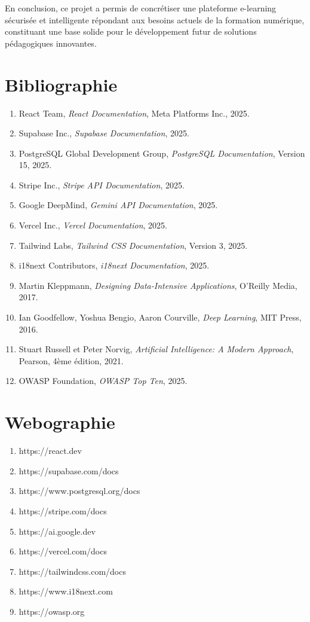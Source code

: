 \documentclass[12pt, a4paper]{report}
\begin{document}
En conclusion, ce projet a permis de concrétiser une plateforme e-learning sécurisée et intelligente répondant aux besoins actuels de la formation numérique, constituant une base solide pour le développement futur de solutions pédagogiques innovantes.

\chapter*{Bibliographie}

\begin{enumerate}
\item React Team, \textit{React Documentation}, Meta Platforms Inc., 2025.
\item Supabase Inc., \textit{Supabase Documentation}, 2025.
\item PostgreSQL Global Development Group, \textit{PostgreSQL Documentation}, Version 15, 2025.
\item Stripe Inc., \textit{Stripe API Documentation}, 2025.
\item Google DeepMind, \textit{Gemini API Documentation}, 2025.
\item Vercel Inc., \textit{Vercel Documentation}, 2025.
\item Tailwind Labs, \textit{Tailwind CSS Documentation}, Version 3, 2025.
\item i18next Contributors, \textit{i18next Documentation}, 2025.
\item Martin Kleppmann, \textit{Designing Data-Intensive Applications}, O'Reilly Media, 2017.
\item Ian Goodfellow, Yoshua Bengio, Aaron Courville, \textit{Deep Learning}, MIT Press, 2016.
\item Stuart Russell et Peter Norvig, \textit{Artificial Intelligence: A Modern Approach}, Pearson, 4ème édition, 2021.
\item OWASP Foundation, \textit{OWASP Top Ten}, 2025.
\end{enumerate}

\chapter*{Webographie}

\begin{enumerate}
\item https://react.dev
\item https://supabase.com/docs
\item https://www.postgresql.org/docs
\item https://stripe.com/docs
\item https://ai.google.dev
\item https://vercel.com/docs
\item https://tailwindcss.com/docs
\item https://www.i18next.com
\item https://owasp.org
\end{enumerate}
\end{document}
